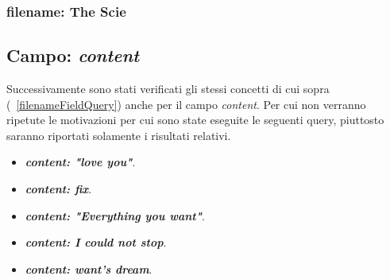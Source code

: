 \documentclass{article}
\begin{document}
\subsubsection{filename: The Scie}
\fi

\subsection{Campo: \textit{content}}
Successivamente sono stati verificati gli stessi concetti di cui sopra (~\ref{filenameFieldQuery}) anche per il campo \textit{content}. Per cui non verranno ripetute le motivazioni per cui sono state eseguite le seguenti query, piuttosto saranno riportati solamente i risultati relativi.
\begin{itemize}
    \item \textbf{\textit{content: "love you"}}.
    \item \textbf{\textit{content: fix}}.
    \item \textbf{\textit{content: "Everything you want"}}.
    \item \textbf{\textit{content: I could not stop}}.
    \item \textbf{\textit{content: want's dream}}.
\end{itemize}

\iffalse
\subsubsection{content: "love you"}
\subsubsection{content: fix}
\subsubsection{content: "Everything you want"}
\subsubsection{content: want's dream}
\subsubsection{content: I could not stop}
\fi
\end{document}
